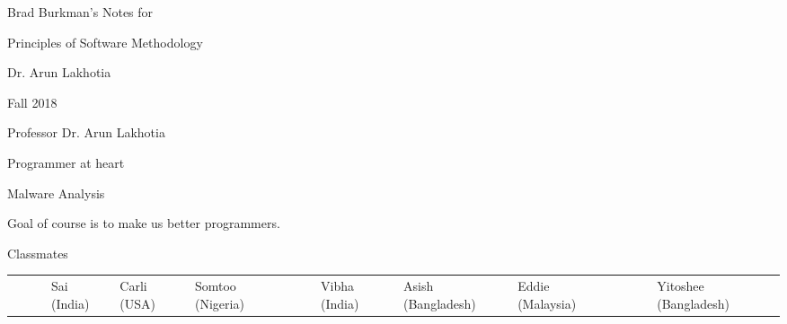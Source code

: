 \documentclass[11pt]{article}
\begin{document}
\setlength{\parindent}{20pt}
\begin{spacing}{1.2}

%
%

Brad Burkman's Notes for

\qquad Principles of Software Methodology

\qquad Dr. Arun Lakhotia

\qquad Fall 2018

\vskip 12pt

Professor Dr. Arun Lakhotia

\qquad Programmer at heart

\qquad Malware Analysis

\vskip 12pt

Goal of course is to make us better programmers.  

\vskip 12pt

Classmates
\vskip 6pt

\begin{tabular}{llllll}
	&&& Sai (India) & Carli (USA) & Somtoo (Nigeria) \cr
	&&& Vibha (India) & Asish (Bangladesh) & Eddie (Malaysia) \cr
	&&&& Yitoshee (Bangladesh) \cr
\end{tabular}

\end{spacing}
\end{document}
